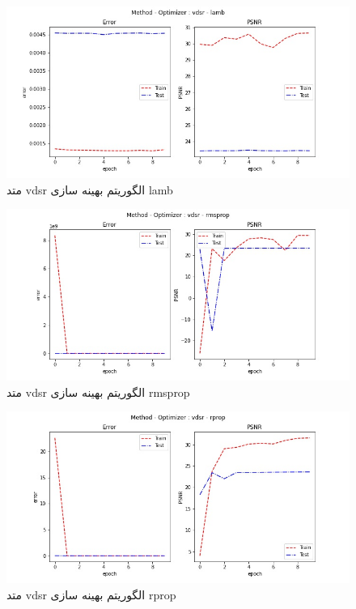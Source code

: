  \begin{figure}[!h] 
       \centering 
       \includegraphics[width=160mm]{./chapter3/images/error-psnr-vdsr-lamb.jpg}
       \caption{متد vdsr الگوریتم بهینه سازی lamb}
       \label{fig:error-psnr-vdsr-lamb}
 \end{figure}
 \begin{figure}[!h] 
       \centering 
       \includegraphics[width=160mm]{./chapter3/images/error-psnr-vdsr-rmsprop.jpg}
       \caption{متد vdsr الگوریتم بهینه سازی rmsprop}
       \label{fig:error-psnr-vdsr-rmsprop}
 \end{figure}
 \begin{figure}[!h] 
       \centering 
       \includegraphics[width=160mm]{./chapter3/images/error-psnr-vdsr-rprop.jpg}
       \caption{متد vdsr الگوریتم بهینه سازی rprop}
       \label{fig:error-psnr-vdsr-rprop}
 \end{figure}
